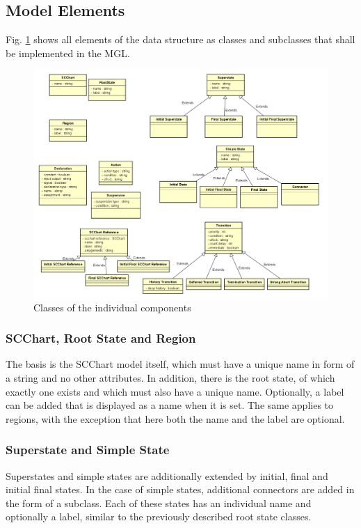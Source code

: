 \subsection{Model Elements}
Fig. \ref{fig:Component_Classes} shows all elements of the data structure as classes and subclasses that shall be implemented in the MGL. 
\begin{figure}[h!]
\centering
\includegraphics[width=1.0\textwidth]{bilder/Component_Classes.png}
\caption{Classes of the individual components}
\label{fig:Component_Classes}
\end{figure} 
\subsubsection{SCChart, Root State and Region}
The basis is the SCChart model itself, which must have a unique name in form of a string and no other attributes. In addition, there is the root state, of which exactly one exists and which must also have a unique name. Optionally, a label can be added that is displayed as a name when it is set. The same applies to regions, with the exception that here both the name and the label are optional. 
\subsubsection{Superstate and Simple State}
Superstates and simple states are additionally extended by initial, final and initial final states. In the case of simple states, additional connectors are added in the form of a subclass. Each of these states has an individual name and optionally a label, similar to the previously described root state classes.
